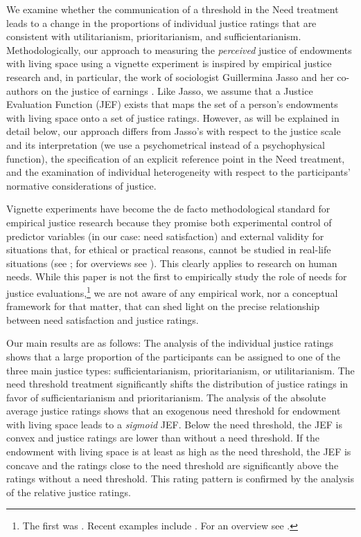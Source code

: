 \documentclass[12pt]{scrartcl}
\begin{document}
We examine whether the communication of a threshold in the Need treatment leads to a change in the proportions of individual justice ratings that are consistent with utilitarianism, prioritarianism, and sufficientarianism.
Methodologically, our approach to measuring the \textit{perceived} justice of endowments with living space using a vignette experiment is inspired by empirical justice research \citep[for an overview see, e.\,g.,][]{sabbagh_handbook_2016} and, in particular, the work of sociologist Guillermina Jasso and her co-authors on the justice of earnings \citep[see, e.\,g.,][]{jasso_distributive_1977,jasso_justice_1978,jasso_methods_1990,jasso_how_1999}.
Like Jasso, we assume that a Justice Evaluation Function (JEF) exists that maps the set of a person's endowments with living space onto a set of justice ratings.
However, as will be explained in detail below, our approach differs from Jasso's with respect to the justice scale and its interpretation (we use a psychometrical instead of a psychophysical function), the specification of an explicit reference point in the Need treatment, and the examination of individual heterogeneity with respect to the participants' normative considerations of justice.

Vignette experiments have become the de facto methodological standard for empirical justice research because they promise both experimental control of predictor variables (in our case: need satisfaction) and external validity for situations that, for ethical or practical reasons, cannot be studied in real-life situations (see \citealp{bardsley_experimental_2009}; for overviews see \citealp{traub_friedman_2005,gaertner_empirical_2012}).
This clearly applies to research on human needs.
While this paper is not the first to empirically study the role of needs for justice evaluations,\footnote{The first was \cite{yaari_dividing_1984}. Recent examples include \cite{kittel_impact_2020,wyszynski_give_2023}. For an overview see \cite{traub_need-based_2020}.} we are not aware of any empirical work, nor a conceptual framework for that matter, that can shed light on the precise relationship between need satisfaction and justice ratings.

Our main results are as follows: The analysis of the individual justice ratings shows that a large proportion of the participants can be assigned to one of the three main justice types: sufficientarianism, prioritarianism, or utilitarianism.
The need threshold treatment significantly shifts the distribution of justice ratings in favor of sufficientarianism and prioritarianism.
The analysis of the absolute average justice ratings shows that an exogenous need threshold for endowment with living space leads to a \textit{sigmoid} JEF.
Below the need threshold, the JEF is convex and justice ratings are lower than without a need threshold.
If the endowment with living space is at least as high as the need threshold, the JEF is concave and the ratings close to the need threshold are significantly above the ratings without a need threshold.
This rating pattern is confirmed by the analysis of the relative justice ratings.
\end{document}
